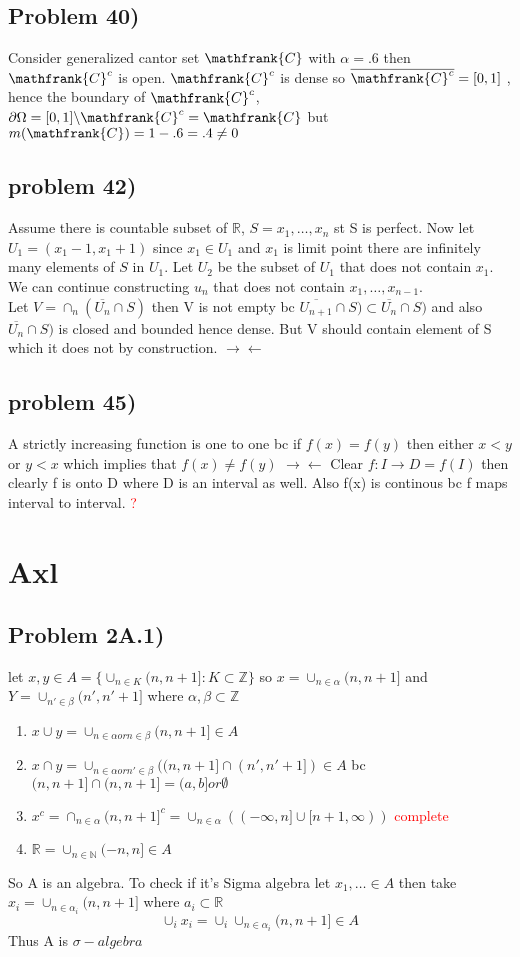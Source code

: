 \documentclass[paper=letter, fontsize=11pt]{scrartcl} %
\newcommand{\R}{\mathbb{R}}
\newcommand{\set}[1]{\{#1\}}
\begin{document}
\subsection{Problem 40)}
Consider generalized cantor set $\mathfrank{C}$ with $\alpha = .6$ then
$\mathfrank{C} ^c$ is open. $\mathfrank{C} ^c$ is dense so $\overline{\mathfrank{C} ^c}=[0,1]$ , hence the boundary of $\mathfrank{C}^c$, $\partial\Omega=[0,1]\backslash \mathfrank{C}^c=\mathfrank{C}$ but $m(\mathfrank{C})=1-.6=.4 \not = 0$
\subsection{problem 42)}  
Assume there is countable subset of $\R$, $S={x_1 , \dots , x_n}$ st S is perfect. Now let $U_1=(x_1-1,x_1+1)$ since $x_1 \in U_1$ and $x_1$ is limit point there are infinitely many elements of $S$ in $U_1$. Let $U_2$ be the subset of $U_1$ that does not contain $x_1$. We can continue constructing $u_n$ that does not contain $x_1,\dots,x_{n-1}$. \\
Let $V= \cap_n (\overline{U_n}\cap S)$ then V is not empty bc $\overline{U_{n+1}}\cap S) \subset \overline{U_n}\cap S)$ and also $\overline{U_n}\cap S)$ is closed and bounded hence dense. But V should contain element of S which it does not by construction. $\rightarrow \leftarrow$
\subsection{problem 45)}
A strictly increasing function is one to one bc if $f(x)=f(y)$ then either $x < y$ or $y<x$ which implies that $f(x) \not = f(y)$ $\rightarrow \leftarrow$
Clear $f: I \rightarrow D=f(I)$ then clearly f is onto D where D is an interval as well. Also f(x) is continous bc f maps interval to interval. \textcolor{red}{?}
\section{Axl}
\subsection{Problem 2A.1)}
let $x,y \in A=\set{\cup_{n \in K} (n,n+1]: K \subset \mathbb{Z}}$ so $x = \cup_{n \in \alpha} (n,n+1]$ and $Y=\cup_{n' \in \beta} (n',n'+1]$ where $\alpha, \beta \subset \mathbb{Z}$
\begin{enumerate}
    \item $x \cup y = \cup_{n \in \alpha or n \in \beta} (n,n+1] \in A$
    \item $x \cap y = \cup_{n \in \alpha or n' \in \beta} ((n,n+1]\cap (n',n'+1]) \in A$ bc $(n,n+1]\cap(n,n+1] = (a,b] or \emptyset$
    \item $x^c=\cap_{n \in \alpha} (n,n+1]^c=\cup_{n \in \alpha} ((-\infty,n] \cup [n+1,\infty))$ \textcolor{red}{complete}
    \item $\mathbb{R}=\cup_{n \in \mathbb{N}} (-n,n] \in A $
\end{enumerate}
So A is an algebra. To check if it's Sigma algebra let $x_1,\dots \in A$ then take $x_i=\cup_{n \in \alpha_i} (n,n+1] $ where $a_i \subset \mathbb{R}$
$$\cup_i x_i = \cup_i \cup_{n \in \alpha_i} (n,n+1] \in A$$
Thus A is $\sigma-algebra$
\end{document}
